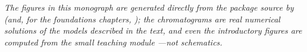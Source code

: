 \vspace{1em}
{\itshape\noindent
The figures in this monograph are generated directly from the package source by
 (and, for the foundations chapters,
); the chromatograms are real numerical
solutions of the models described in the text, and even the introductory figures
are computed from the small teaching module
---not schematics.\par}
